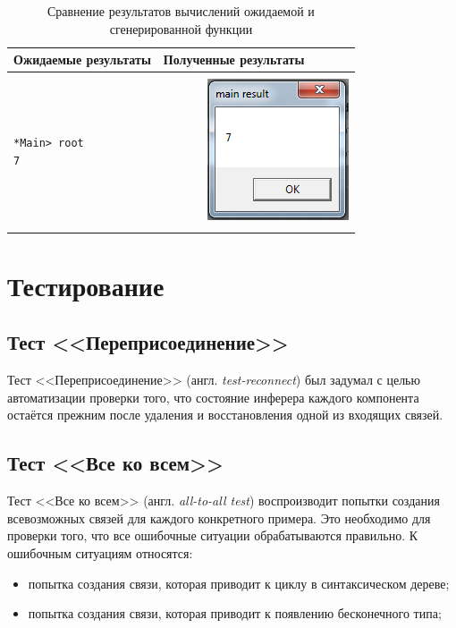\begin{table}[h]
\centering
\begin{tabular}{|l|l|}
\hline
Ожидаемые результаты & Полученные результаты \\
\hline
 & \\
\begin{minipage}{2in}
	\begin{verbatim}
*Main> root
7
	\end{verbatim}
\end{minipage} &
~~~~~~~\includegraphics{img/result.PNG} \\
 & \\
\hline
\end{tabular}
\caption{Сравнение результатов вычислений ожидаемой и сгенерированной функции}\label{exprealres}
\end{table}

\chapter{Тестирование}
\section{Тест <<Переприсоединение>>}
Тест <<Переприсоединение>> (англ. \textit{test-reconnect}) был задумал с целью автоматизации проверки того, что состояние инферера каждого компонента остаётся прежним после удаления и восстановления одной из входящих связей.
\section{Тест <<Все ко всем>>}
Тест <<Все ко всем>> (англ. \textit{all-to-all test}) воспроизводит попытки создания всевозможных связей для каждого конкретного примера. Это необходимо для проверки того, что все ошибочные ситуации обрабатываются правильно. К ошибочным ситуациям относятся:
\begin{itemize}
	\item попытка создания связи, которая приводит к циклу в синтаксическом дереве;
	\item попытка создания связи, которая приводит к появлению бесконечного типа;
\end{itemize}


